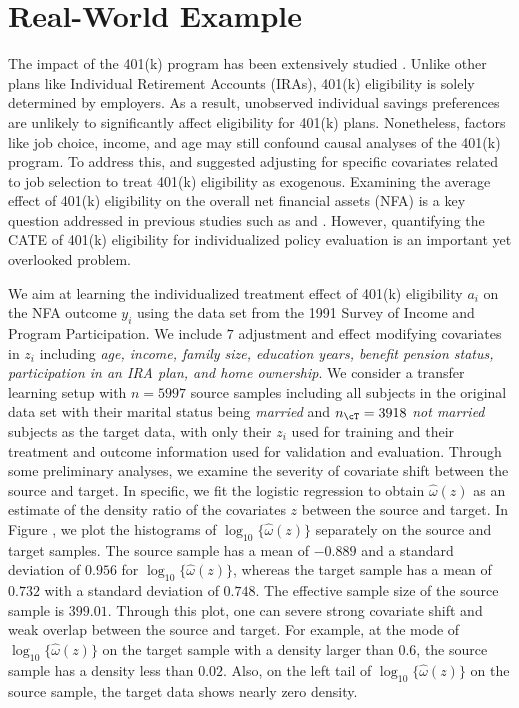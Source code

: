 \documentclass[12pt,a4paper,pdftex,onepage]{article}
\begin{document}
\section{Real-World Example}

The impact of the 401(k) program has been extensively studied \citep[e.g.,]{abadie2003semiparametric}. Unlike other plans like Individual Retirement Accounts (IRAs), 401(k) eligibility is solely determined by employers. As a result, unobserved individual savings preferences are unlikely to significantly affect eligibility for 401(k) plans. Nonetheless, factors like job choice, income, and age may still confound causal analyses of the 401(k) program. To address this, \citep{abadie2003semiparametric} and \citep{chernozhukov2018double} suggested adjusting for specific covariates related to job selection to treat 401(k) eligibility as exogenous. Examining the average effect of 401(k) eligibility on the overall net financial assets (NFA) is a key question addressed in previous studies such as \cite{abadie2003semiparametric} and \cite{chernozhukov2018double}. However, quantifying the CATE of 401(k) eligibility for individualized policy evaluation is an important yet overlooked problem.


We aim at learning the individualized treatment effect of 401(k) eligibility $a_i$ on the NFA outcome $y_i$ using the data set from the 1991 Survey of Income and Program Participation. We include $7$ adjustment and effect modifying covariates in $z_i$ including {\em age, income, family size, education years, benefit pension status, participation in an IRA plan, and home ownership}. We consider a transfer learning setup with $n=5997$ source samples including all subjects in the original data set with their marital status being {\em married} and $n_{\cT}=3918$ {\em not married} subjects as the target data, with only their $z_i$ used for training and their treatment and outcome information used for validation and evaluation. Through some preliminary analyses, we examine the severity of covariate shift between the source and target. In specific, we fit the logistic regression to obtain $\widehat{\omega}(z)$ as an estimate of the density ratio of the covariates $z$ between the source and target. In Figure , we plot the histograms of $\log_{10}\{\widehat{\omega}(z)\}$ separately on the source and target samples. The source sample has a mean of $-0.889$ and a standard deviation of $0.956$ for $\log_{10}\{\widehat{\omega}(z)\}$, whereas the target sample has a mean of $0.732$ with a standard deviation of $0.748$. The effective sample size of the source sample is $399.01$. Through this plot, one can severe strong covariate shift and weak overlap between the source and target. For example, at the mode of $\log_{10}\{\widehat{\omega}(z)\}$ on the target sample with a density larger than $0.6$, the source sample has a density less than $0.02$. Also, on the left tail of $\log_{10}\{\widehat{\omega}(z)\}$ on the source sample, the target data shows nearly zero density.
\end{document}

